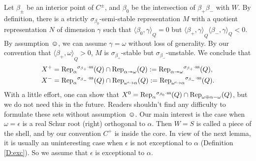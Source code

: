 \documentclass{amsart}
\theoremstyle{definition}
\theoremstyle{remark}
\numberwithin{equation}{section}
\begin{document}
Let $\beta_{\pm}$ be an interior point of $C^{\pm}$, and $\beta_0$ be the intersection of $\beta_+\beta_-$ with $W$.
By definition, there is a strictly $\sigma_{\beta_0}$-semi-stable representation $M$ with a quotient representation $N$ of dimension $\gamma$ such that ${\langle{\beta_0,\gamma}\rangle}_Q=0$ but ${\langle{\beta_+,\gamma}\rangle}_Q{\langle{\beta_-,\gamma}\rangle}_Q<0$.
By assumption $\smiley$, we can assume $\gamma=\omega$ without loss of generality.
By our convention that ${\langle{\beta_+,\omega}\rangle}_Q>0$, $M$ is $\sigma_{\beta_+}$-stable but $\sigma_{\beta_-}$-unstable. We conclude that
\begin{align*}
  X^{+} &= {\operatorname{Rep}}_\alpha{^{\sigma_{{\beta_+}}\cdot{\rm {ss}}}}(Q)\cap{\operatorname{Rep}}_{\alpha\twoheadrightarrow\omega}(Q):={\operatorname{Rep}}_{\alpha\twoheadrightarrow\omega}{^{\sigma_{{\beta_+}}\cdot{\rm {ss}}}}(Q),\\
  X^{-} &= {\operatorname{Rep}}_\alpha{^{\sigma_{{\beta_-}}\cdot{\rm {ss}}}}(Q)\cap{\operatorname{Rep}}_{\omega\hookrightarrow\alpha}(Q):={\operatorname{Rep}}_{\omega\hookrightarrow\alpha}{^{\sigma_{{\beta_-}}\cdot{\rm {ss}}}}(Q).
\end{align*}
With a little effort, one can show that $X^0 = {\operatorname{Rep}}_\alpha{^{\sigma_{{\beta_0}}\cdot{\rm {ss}}}}(Q)\cap{\operatorname{Rep}}_{\omega\oplus\alpha-\omega}(Q)$, but we do not need this in the future.
Readers shouldn't find any difficulty to formulate these sets without assumption $\smiley$. Our main interest is the case when $\omega=\epsilon$ is a real Schur root (right) orthogonal to $\alpha$. Then $W=S$ is called a piece of the shell, and by our convention $C^+$ is inside the core. In view of the next lemma, it is usually an uninteresting case when $\epsilon$ is not exceptional to $\alpha$ (Definition \ref{D:exc}). So we assume that $\epsilon$ is exceptional to $\alpha$.
\end{document}
